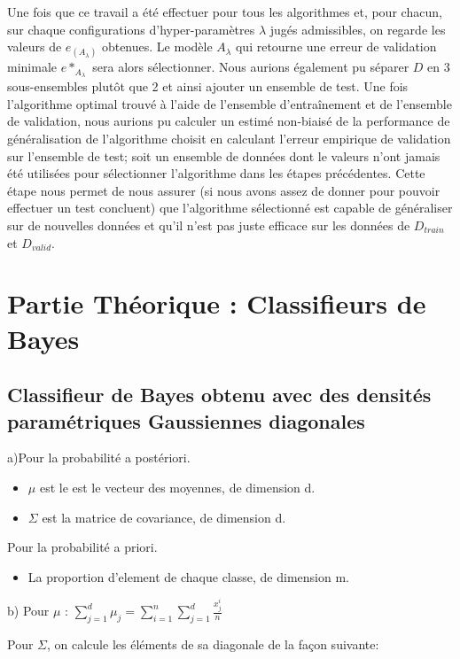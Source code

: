 \documentclass[a4paper,10pt]{article}
\begin{document}
Une fois que ce travail a été effectuer pour tous les algorithmes et, pour chacun, sur chaque configurations d'hyper-paramètres $\lambda$ jugés admissibles, on regarde les valeurs de $e_{(A_{\lambda})}$ obtenues. Le modèle $A_{\lambda}$ qui retourne une erreur de validation minimale $e*_{A_{\lambda}}$ sera alors sélectionner. 
Nous aurions également pu séparer $D$ en 3 sous-ensembles plutôt que 2 et ainsi ajouter un ensemble de test. Une fois l'algorithme optimal trouvé à l'aide de l'ensemble d'entraînement et de l'ensemble de validation, nous aurions pu calculer un estimé non-biaisé de la performance de généralisation de l'algorithme choisit en calculant l'erreur empirique de validation sur l'ensemble de test; soit un ensemble de données dont le valeurs n'ont jamais été utilisées pour sélectionner l'algorithme dans les étapes précédentes. Cette étape nous permet de nous assurer (si nous avons assez de donner pour pouvoir effectuer un test concluent) que l'algorithme sélectionné est capable de généraliser sur de nouvelles données et qu'il n'est pas juste efficace sur les données de $D_{train}$ et $D_{valid}$.



\section{Partie Théorique : Classifieurs de Bayes}

\subsection{Classifieur de Bayes obtenu avec des densités paramétriques Gaussiennes diagonales}

a)Pour la probabilité a postériori.
\begin{itemize}
	\item $\mu$ est le est le vecteur des moyennes, de dimension d.
	\item $\Sigma$ est la matrice de covariance, de dimension d.
\end{itemize}
Pour la probabilité a priori.
\begin{itemize}
	\item La proportion d'element de chaque classe, de dimension m.
\end{itemize}

b)
Pour $\mu$ :
$\sum_{j=1}^{d} \mu_{j} = \sum_{i=1}^{n}\sum_{j=1}^{d} \frac{x_{j}^{i}}{n}$

Pour $\Sigma$, on calcule les éléments de sa diagonale de la façon suivante:
\end{document}
